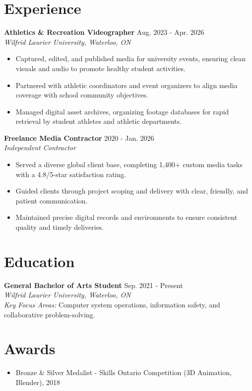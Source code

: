 \documentclass[a4paper,10pt]{article}
\begin{document}
\section*{Experience}
\textbf{Athletics \& Recreation Videographer} \hfill Aug. 2023 - Apr. 2026 \\
\textit{Wilfrid Laurier University, Waterloo, ON}
\begin{itemize}
    \item Captured, edited, and published media for university events, ensuring clean visuals and audio to promote healthy student activities.
    \item Partnered with athletic coordinators and event organizers to align media coverage with school community objectives.
    \item Managed digital asset archives, organizing footage databases for rapid retrieval by student athletes and athletic departments.
\end{itemize}

\vspace{3pt}
\textbf{Freelance Media Contractor} \hfill 2020 - Jan. 2026 \\
\textit{Independent Contractor}
\begin{itemize}
    \item Served a diverse global client base, completing 1,400+ custom media tasks with a 4.8/5-star satisfaction rating.
    \item Guided clients through project scoping and delivery with clear, friendly, and patient communication.
    \item Maintained precise digital records and environments to ensure consistent quality and timely deliveries.
\end{itemize}

\section*{Education}
\textbf{General Bachelor of Arts Student} \hfill Sep. 2021 - Present \\
\textit{Wilfrid Laurier University, Waterloo, ON} \\
\textit{Key Focus Areas:} Computer system operations, information safety, and collaborative problem-solving.

\section*{Awards}
\begin{itemize}
    \item Bronze \& Silver Medalist - Skills Ontario Competition (3D Animation, Blender), 2018
\end{itemize}
\end{document}
